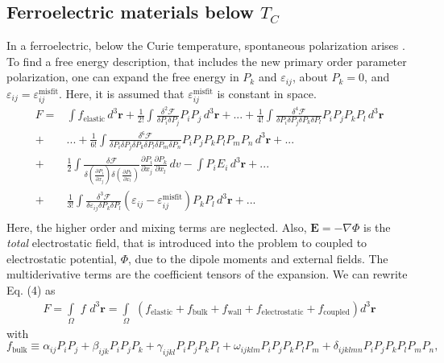 \documentclass[16pt]{article} %
\begin{document}
\subsection{Ferroelectric materials below $T_C$}
%
In a ferroelectric, below the Curie temperature, spontaneous polarization arises \cite{LinesBook, RabeBook}.
%
To find a free energy description, that includes the new primary order parameter polarization, one can expand the free energy in $P_k$ and $\varepsilon_{ij}$, about $P_k = 0$, and $\varepsilon_{ij} =  \varepsilon_{ij}^\mathrm{misfit}$.
%
Here, it is assumed that $\varepsilon_{ij}^\mathrm{misfit}$ is constant in space. 
%
\begin{align}\tag{4}\label{eqn:Landau}\nonumber
F =&\int f_\mathrm{elastic} \,d^3 \textbf{r} + \frac{1}{2!}\int \frac{\delta^2 {\mathcal F}}{\delta P_i\delta P_j}P_i P_j\,d^3 \textbf{r}
+ ... + \frac{1}{4!}\int \frac{\delta^4 {\mathcal F}}{\delta P_i\delta P_j \delta P_k \delta P_l}
P_iP_jP_kP_l\, d^3 \textbf{r}\nonumber\\
+ &... +  \frac{1}{6!}\int \frac{\delta^6 {\mathcal F}}{\delta P_i\delta P_j \delta P_k \delta P_l\delta P_m \delta P_n}
P_iP_jP_kP_lP_m P_n\,d^3 \textbf{r} + ... \nonumber\\
+& \frac{1}{2}\int \frac{\delta {\mathcal F}}
{
\delta\left(\frac{\partial P_i}{\partial x_j}\right)
\delta\left(\frac{\partial P_k}{\partial x_l}\right)
}
\frac{\partial P_i}{\partial x_j}\frac{\partial P_k}{\partial x_l}\,dv-\int P_iE_i\,d^3 \textbf{r} + ...\nonumber\\
+& \frac{1}{3!}\int \frac{\delta^3 {\mathcal F}}{\delta \varepsilon_{ij}\delta P_k\delta P_l}
\left(\varepsilon_{ij}-\varepsilon_{ij}^\mathrm{misfit}\right)P_kP_l\,d^3 \textbf{r} +... \\ \nonumber
\end{align}\nonumber
%
Here, the higher order and mixing terms are neglected. Also, ${\mathbf E} = - \nabla \Phi$ is the {\em total} electrostatic field, that is introduced into the problem to coupled to electrostatic potential, $\Phi$, due to the dipole moments and external fields.
%
The multiderivative terms are the coefficient tensors of the expansion. We can rewrite Eq. (4) as
%
\begin{align}\tag{5}\label{eqn:Landau}
F = \int\limits_\Omega \,\, f \,\,d^3 \textbf{r} = \int\limits_\Omega \,\, \left( f_\mathrm{elastic} + f_\mathrm{bulk} + f_\mathrm{wall} + f_\mathrm{electrostatic} + f_\mathrm{coupled} \right) d^3 \textbf{r} 
\end{align}
%
with
%
\begin{equation}\tag{6}
f_\mathrm{bulk} \equiv \alpha_{ij} P_i P_j + \beta_{ijk} P_i P_j P_k + \gamma_{ijkl} P_i P_j P_k P_l + \omega_{ijklm} P_i P_j P_k P_l P_m + \delta_{ijklmn} P_i P_j P_k P_l P_m P_n,
\end{equation}
\end{document}
